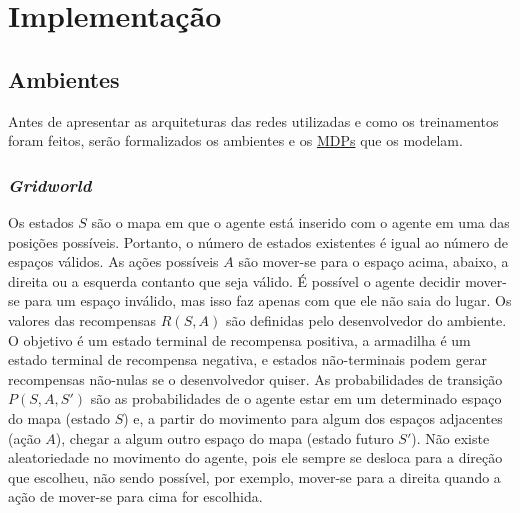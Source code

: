 


\chapter{Implementação}
\label{cap:implementacao}

\section{Ambientes}
\label{sec:envs}


Antes de apresentar as arquiteturas das redes utilizadas e como os treinamentos foram feitos, serão formalizados os ambientes e os \hyperref[sec:mdp]{MDPs} que os modelam.

\subsection{\textit{Gridworld}}
\label{sec:env_gw}

Os estados $S$ são o mapa em que o agente está inserido com o agente em uma das posições possíveis.
Portanto, o número de estados existentes é igual ao número de espaços válidos.
As ações possíveis $A$ são mover-se para o espaço acima, abaixo, a direita ou a esquerda contanto que seja válido.
É possível o agente decidir mover-se para um espaço inválido, mas isso faz apenas com que ele não saia do lugar.
Os valores das recompensas $R(S,A)$ são definidas pelo desenvolvedor do ambiente.
O objetivo é um estado terminal de recompensa positiva, a armadilha é um estado terminal de recompensa negativa, e estados não-terminais podem gerar recompensas não-nulas se o desenvolvedor quiser.
As probabilidades de transição $P(S,A,S')$ são as probabilidades de o agente estar em um determinado espaço do mapa (estado $S$) e, a partir do movimento para algum dos espaços adjacentes (ação $A$), chegar a algum outro espaço do mapa (estado futuro $S'$).
Não existe aleatoriedade no movimento do agente, pois ele sempre se desloca para a direção que escolheu, não sendo possível, por exemplo, mover-se para a direita quando a ação de mover-se para cima for escolhida.

